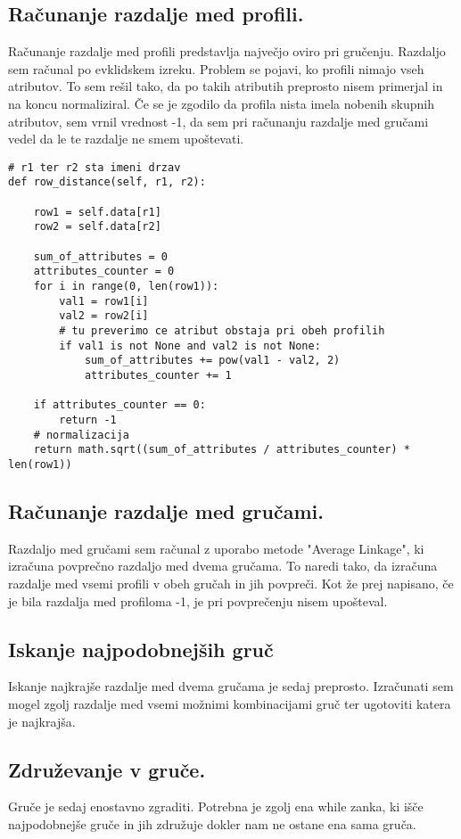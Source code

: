 \documentclass[a4paper,11pt]{article}
\begin{document}
\subsection{Računanje razdalje med profili.}
Računanje razdalje med profili predstavlja največjo oviro pri gručenju. Razdaljo sem računal po evklidskem izreku. Problem se pojavi, ko profili nimajo vseh atributov. To sem rešil tako, da po takih atributih preprosto nisem primerjal in na koncu normaliziral. Če se je zgodilo da profila nista imela nobenih skupnih atributov, sem vrnil vrednost -1, da sem pri računanju razdalje med gručami vedel da le te razdalje ne smem upoštevati.

\begin{lstlisting}
# r1 ter r2 sta imeni drzav
def row_distance(self, r1, r2):

    row1 = self.data[r1]
    row2 = self.data[r2]

    sum_of_attributes = 0
    attributes_counter = 0
    for i in range(0, len(row1)):
        val1 = row1[i]
        val2 = row2[i]
        # tu preverimo ce atribut obstaja pri obeh profilih
        if val1 is not None and val2 is not None:
            sum_of_attributes += pow(val1 - val2, 2)
            attributes_counter += 1

    if attributes_counter == 0:
        return -1
    # normalizacija
    return math.sqrt((sum_of_attributes / attributes_counter) * len(row1))
\end{lstlisting}

\subsection{Računanje razdalje med gručami.}
Razdaljo med gručami sem računal z uporabo metode "Average Linkage", ki izračuna povprečno razdaljo med dvema gručama. To naredi tako, da izračuna razdalje med vsemi profili v obeh gručah in jih povpreči. Kot že prej napisano, če je bila razdalja med profiloma -1, je pri povprečenju nisem upošteval.

\subsection{Iskanje najpodobnejših gruč}
Iskanje najkrajše razdalje med dvema gručama je sedaj preprosto. Izračunati sem mogel zgolj razdalje med vsemi možnimi kombinacijami gruč ter ugotoviti katera je najkrajša.

\subsection{Združevanje v gruče.}
Gruče je sedaj enostavno zgraditi. Potrebna je zgolj ena while zanka, ki išče najpodobnejše gruče in jih združuje dokler nam ne ostane ena sama gruča.
\end{document}
